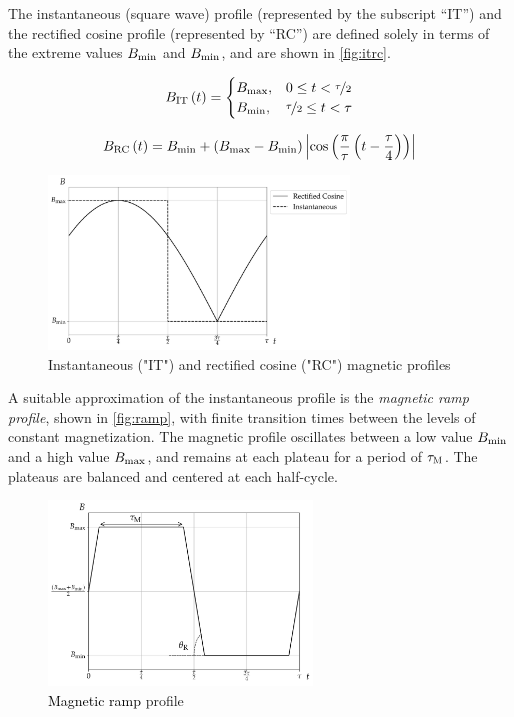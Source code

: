 \documentclass[referee]{svjour3}
\begin{document}
The instantaneous (square wave) profile (represented by the subscript ``IT'') and the rectified cosine profile (represented by ``RC'') are defined solely in terms of the extreme values $B_{\mathrm{min}}$ and $B_{\mathrm{min}}$, and are shown in \autoref{fig:itrc}.


\begin{equation}
{B}_{\mathrm{IT}}\,(t)=
\begin{cases}
{B}_{\mathrm{max}}, & 0 \le t < \nicefrac{\tau}{2} \\
{B}_{\mathrm{min}}, & \nicefrac{\tau}{2} \le t < \tau\\
\end{cases}
\label{eq:199}
\end{equation}

\begin{equation}
{B}_{\mathrm{RC}}\,(t) = B_{\mathrm{min}} + \left(B_{\mathrm{max}} - B_{\mathrm{min}}\right)  \left\lvert \cos\left( \frac{\pi}{\tau} \left( t - \frac{\tau}{4}\right)\right) \right\rvert
\label{eq:200}
\end{equation}

\begin{figure}[!ht]
  \centering
  \includegraphics[width=8cm]{profiles_it_and_rc}
  \caption{Instantaneous ("IT") and rectified cosine ("RC") magnetic profiles}
  \label{fig:itrc}
\end{figure}

A suitable approximation of the instantaneous profile is the \emph{magnetic ramp profile}, shown in \autoref{fig:ramp}, with finite transition times between the levels of constant magnetization. The magnetic profile oscillates  between a low value \({B}_{\mathrm{min}}\) and a high value \({B}_{\mathrm{max}}\), and remains at each plateau for a period of \(\tau_{\mathrm{M}}\). The plateaus are balanced and centered at each half-cycle.

\begin{figure}[!ht]
  \centering
  \includegraphics[width=7cm]{profile_rm}
  \caption{\textcolor{black}{Magnetic ramp}  profile}
  \label{fig:ramp}
\end{figure}
\end{document}
